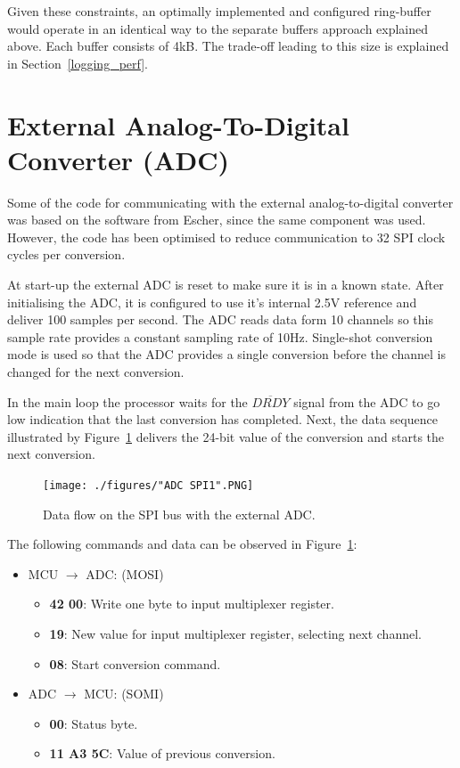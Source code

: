Given these constraints, an optimally implemented and configured ring-buffer would operate in an identical way to the separate buffers approach explained above. Each buffer consists of 4kB. The trade-off leading to this size is explained in Section~\ref{logging_perf}.

\section{External Analog-To-Digital Converter (ADC)}

Some of the code for communicating with the external analog-to-digital converter was based on the software from Escher, since the same component was used. However, the code has been optimised to reduce communication to 32 SPI clock cycles per conversion.

At start-up the external ADC is reset to make sure it is in a known state. After initialising the ADC, it is configured to use it's internal 2.5V reference and deliver 100 samples per second. The ADC reads data form 10 channels so this sample rate provides a constant sampling rate of 10Hz. Single-shot conversion mode is used so that the ADC provides a single conversion before the channel is changed for the next conversion.

In the main loop the processor waits for the $\overline{DRDY}$ signal from the ADC to go low indication that the last conversion has completed. Next, the data sequence illustrated by Figure~\ref{fig:adc_spi} delivers the 24-bit value of the conversion and starts the next conversion.

\begin{figure}[H]
    \centering \texttt{[image: ./figures/"ADC SPI1".PNG]}
    \caption{Data flow on the SPI bus with the external ADC.}
    \label{fig:adc_spi}
\end{figure}

The following commands and data can be observed in Figure~\ref{fig:adc_spi}:

\begin{itemize}
    \item MCU $\rightarrow$ ADC: (MOSI)
    \begin{itemize}
        \item \textbf{42 00}: Write one byte to input multiplexer register.
        \item \textbf{19}: New value for input multiplexer register, selecting next channel.
        \item \textbf{08}: Start conversion command.
    \end{itemize}
    \item ADC $\rightarrow$ MCU: (SOMI)
    \begin{itemize}
        \item \textbf{00}: Status byte.
        \item \textbf{11 A3 5C}: Value of previous conversion.
    \end{itemize}
\end{itemize}

